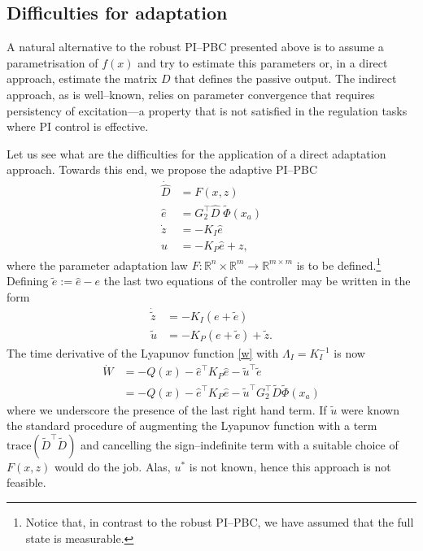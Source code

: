 \documentclass[10pt, conference]{ieeeconf}
\newcommand{\Gstas}{G_2}
\def\rea{\mathbb{R}}
\def\lab{\label}
\begin{document}
\subsection{Difficulties for adaptation}
\lab{subsec52}	
A natural alternative to the robust PI--PBC presented above is to assume a parametrisation of $f(x)$ and try to estimate this parameters or, in a direct approach, estimate the matrix $D$ that defines the passive output. The indirect approach, as is well--known,  relies on parameter convergence that requires persistency of excitation---a property that is not satisfied in the regulation tasks where PI control is effective.

Let us see what are the difficulties for the application of a direct adaptation approach. Towards this end, we propose the adaptive PI--PBC
$$
\begin{aligned}
                 \dot{\hat D} &=F(x,z)\\
                 \hat e&=\Gstas^\top  \hat D\; \widetilde {\Phi}(x_a)\\
                 \dot{z} &= - K_I \hat e\\
                   u &= - K_P \hat e + z,
	\end{aligned}
$$
where the parameter adaptation law $F:\rea^n \times \rea^m \to \rea^{m \times m}$ is to be defined.\footnote{Notice that, in contrast to the robust PI--PBC, we have assumed that the full state is measurable.} Defining $\tilde e:=\hat e-e$ the last two equations of the controller may be written in the form
$$
\begin{aligned}
                 \dot {\tilde z} &= - K_I( e+\tilde e)\\
		\tilde u &= - K_P (e+\tilde e) + \tilde z.
	\end{aligned}
$$
The time derivative of the Lyapunov function \eqref{w} with $ \Lambda_I= K_I^{-1}$ is now
$$
	\begin{aligned}
		\dot{W} &= -Q(x) - \hat e^\top K_P \hat e - \tilde{u}^\top \tilde e\\
		 &= -Q(x) - \hat e^\top K_P \hat e - \tilde{u}^\top \Gstas^\top  \tilde D \widetilde {\Phi}(x_a)
	\end{aligned}
$$
where we underscore the presence of the last right hand term. If $\tilde u$ were known the standard procedure of augmenting the Lyapunov function with a term $\mbox{trace} (\tilde D^\top \tilde D)$ and cancelling the sign--indefinite term with a suitable choice of $F(x,z)$ would do the job. Alas, $u^*$ is not known, hence this approach is not feasible. 
\end{document}
